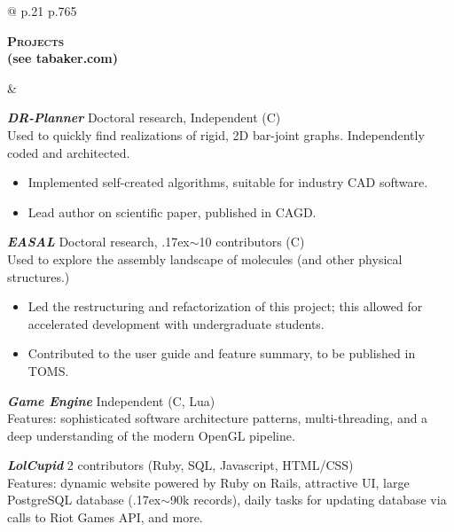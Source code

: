 \documentclass[11pt]{article}
\def\mytilde{{\raise.17ex\hbox{$\scriptstyle\mathtt{\sim}$}}}
\def\cpp{{C\nolinebreak[4]\hspace{-.05em}\raisebox{.4ex}{\tiny\bf ++}}}
\newcommand{\titlecell}[1]{%
    \begin{minipage}[t]{\linewidth}
        \raggedleft \textbf{#1}
    \end{minipage}}
\newcommand{\contentcell}[1]{%
    \begin{minipage}[t]{\linewidth}
        #1
    \end{minipage}}
\newcommand{\tablerowskip}{\vspace{4.9mm} \\}
\newcommand{\projectskip}{\vspace{4.4mm}}
\newcommand{\contentcellheader}[1]{\textbf{\textsl{#1}}}
\begin{document}
\begin{tabular}{@{} p{.21\textwidth} p{.765\textwidth}}
    \titlecell{\textsc{Projects} \\ (see tabaker.com)} &
    \contentcell{
        \contentcellheader{DR-Planner} \hfill Doctoral research, Independent (\cpp)
        \\ Used to quickly find realizations of rigid, 2D bar-joint graphs. Independently coded and architected.
        \begin{itemize}[itemsep=0pt,topsep=0pt,leftmargin=*] \itemsep -2pt
            \item Implemented self-created algorithms, suitable for industry CAD software.
            \item Lead author on scientific paper, published in CAGD.
        \end{itemize}
        \projectskip

        \contentcellheader{EASAL} \hfill Doctoral research, \mytilde 10 contributors (\cpp)
        \\ Used to explore the assembly landscape of molecules (and other physical structures.)
        \begin{itemize}[itemsep=0pt,topsep=0pt,leftmargin=*] \itemsep -2pt
            \item Led the restructuring and refactorization of this project; this allowed for accelerated development with undergraduate students.
            \item Contributed to the user guide and feature summary, to be published in TOMS.
        \end{itemize}
        \projectskip

        \contentcellheader{Game Engine} \hfill Independent (\cpp, Lua)
        \\ Features: sophisticated software architecture patterns, multi-threading, and a deep understanding of the modern OpenGL
        pipeline.
        \projectskip

        \contentcellheader{LolCupid} \hfill 2 contributors (Ruby, SQL, Javascript, HTML/CSS)
        \\ Features: dynamic website powered by Ruby on Rails, attractive UI, large PostgreSQL database (\mytilde 90k records), daily tasks for updating database via calls to Riot Games API, and more.
    }
    \tablerowskip


\end{tabular}
\end{document}
